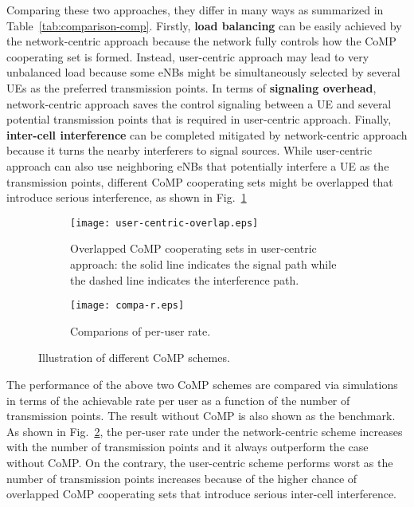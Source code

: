 \documentclass[a4paper,12pt]{article}%
\begin{document}
{Comparing these two approaches, they differ in many ways as summarized in Table~\ref{tab:comparison-comp}. Firstly, \textbf{load balancing} can be easily achieved by the network-centric approach because the network fully controls how the CoMP cooperating set is formed. Instead, user-centric approach may lead to very unbalanced load because some eNBs might be simultaneously selected by several UEs as the preferred transmission points. In terms of \textbf{signaling overhead}, network-centric approach saves the control signaling between a UE and several potential transmission points that is required in user-centric approach. Finally, \textbf{inter-cell interference} can be completed mitigated by network-centric approach because it turns the nearby interferers to signal sources. While user-centric approach can also use neighboring eNBs that potentially interfere a UE as the transmission points, different CoMP cooperating sets might be overlapped that introduce serious interference, as shown in Fig.~\ref{fig:overlapped-comp}

\begin{figure}
    \centering
    \begin{subfigure}[t]{0.45\textwidth}
        \centering
        \texttt{[image: user-centric-overlap.eps]}
        \caption{Overlapped CoMP cooperating sets in user-centric approach: the solid line indicates the signal path while the dashed line indicates the interference path.}\label{fig:overlapped-comp}
    \end{subfigure}
    \quad
    \begin{subfigure}[t]{0.45\textwidth}
        \centering
        \texttt{[image: compa-r.eps]}
        \caption{Comparions of per-user rate.}\label{fig:rate-comparison-comp}
    \end{subfigure}
    \caption{Illustration of different CoMP schemes.}\label{fig:comp-comparison}
\end{figure}

The performance of the above two CoMP schemes are compared via simulations in terms of the achievable rate per user as a function of the number of transmission points. The result without CoMP is also shown as the benchmark. As shown in Fig.~\ref{fig:rate-comparison-comp}, the per-user rate under the network-centric scheme increases with the number of transmission points and it always outperform the case without CoMP. On the contrary, the user-centric scheme performs worst as the number of transmission points increases because of the higher chance of overlapped CoMP cooperating sets that introduce serious inter-cell interference.

}
\end{document}
